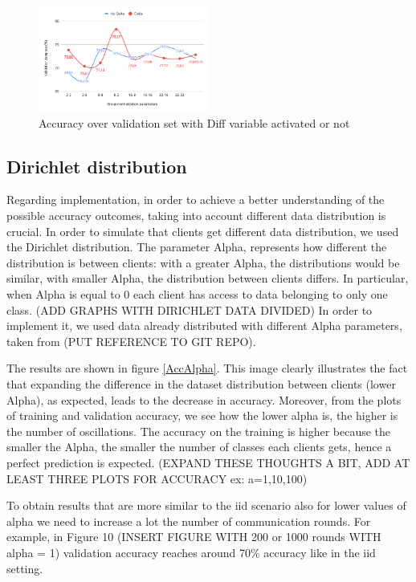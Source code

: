 \documentclass[twocolumn]{article}
\begin{document}
\begin{figure}
    \centering
    \includegraphics[width=0.5\textwidth,height=.3\textheight]{groupnormalizationDeltaNoDelta.png}
    \caption{Accuracy over validation set with Diff variable activated or not}
     \label{AccDiff} 
\end{figure}

\subsection{Dirichlet distribution}

Regarding implementation, in order to achieve a better understanding of the possible accuracy outcomes, taking into account different data distribution is crucial. In order to simulate that clients get different data distribution, we used the Dirichlet distribution. The parameter Alpha, represents how different the distribution is between clients: with a greater Alpha, the distributions 
would be similar, with smaller Alpha, the distribution between clients differs.
In particular, when Alpha is equal to 0 each client has access to data belonging to only one class.
(ADD GRAPHS WITH DIRICHLET DATA DIVIDED)
In order to implement it, we used data already distributed with different Alpha parameters, taken from (PUT REFERENCE TO GIT REPO).

The results are shown in figure \ref{AccAlpha}. This image clearly illustrates the fact that expanding the difference in the dataset distribution between clients (lower Alpha), as expected, leads to the decrease in accuracy. 
Moreover, from the plots of training and validation accuracy, we see how the lower alpha is, the higher is the number of oscillations.
The accuracy on the training is higher because the smaller the Alpha, the smaller the number of classes each clients gets, hence a perfect prediction is expected. 
(EXPAND THESE THOUGHTS A BIT, ADD AT LEAST THREE PLOTS FOR ACCURACY ex: a=1,10,100)

To obtain results that are more similar to the iid scenario also for lower values of alpha we need to increase a lot the number of communication rounds. For example, in Figure 10 (INSERT FIGURE WITH 200 or 1000 rounds WITH alpha = 1) validation accuracy reaches around 70\% accuracy like in the iid setting.
\end{document}
